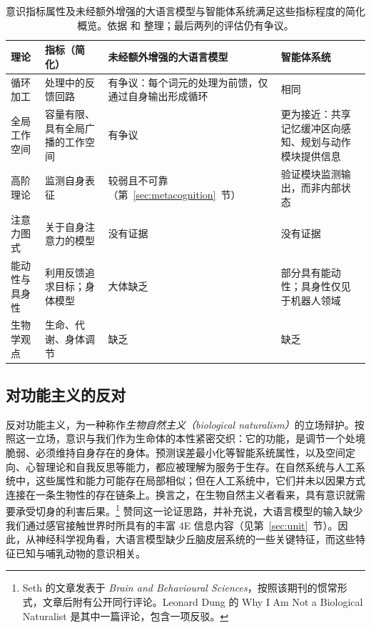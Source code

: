 \begin{table}
\footnotesize
\begin{tabularx}{\textwidth}{@{}p{2.6cm}p{3.4cm}XX@{}}
\toprule
\textbf{理论} & \textbf{指标（简化）} & \textbf{未经额外增强的大语言模型} & \textbf{智能体系统} \\
\midrule
循环加工 & 处理中的反馈回路 & 有争议：每个词元的处理为前馈，仅通过自身输出形成循环 & 相同 \\
全局工作空间 & 容量有限、具有全局广播的工作空间 & 有争议 & 更为接近：共享记忆缓冲区向感知、规划与动作模块提供信息 \\
高阶理论 & 监测自身表征 & 较弱且不可靠（第~\ref{sec:metacognition}~节） & 验证模块监测输出，而非内部状态 \\
注意力图式 & 关于自身注意力的模型 & 没有证据 & 没有证据 \\
能动性与具身性 & 利用反馈追求目标；身体模型 & 大体缺乏 & 部分具有能动性；具身性仅见于机器人领域 \\
生物学观点 & 生命、代谢、身体调节 & 缺乏 & 缺乏 \\
\bottomrule
\end{tabularx}
\caption{意识指标属性及未经额外增强的大语言模型与智能体系统满足这些指标程度的简化概览。依据 \citet{butlin2023consciousness} 和 \citet{goldstein2024case} 整理；最后两列的评估仍有争议。}\label{tab:indicators}
\end{table}

\subsection{对功能主义的反对} \label{againstfunct}
\citep{seth2025conscious} 反对功能主义，为一种称作\emph{生物自然主义（biological naturalism）}的立场辩护。按照这一立场，意识与我们作为生命体的本性紧密交织：它的功能，是调节一个处境脆弱、必须维持自身存在的身体。预测误差最小化等智能系统属性，以及空间定向、心智理论和自我反思等能力，都应被理解为服务于生存。在自然系统与人工系统中，这些属性和能力可能存在局部相似；但在人工系统中，它们并未以因果方式连接在一条生物性的存在链条上。换言之，在生物自然主义者看来，具有意识就需要承受切身的利害后果。\footnote{Seth 的文章发表于 \textit{Brain and Behavioural Sciences}，按照该期刊的惯常形式，文章后附有公开同行评论。Leonard Dung 的 Why I Am Not a Biological Naturalist 是其中一篇评论，包含一项反驳。}\citet{aru2023feasibility} 赞同这一论证思路，并补充说，大语言模型的输入缺少我们通过感官接触世界时所具有的丰富 4E 信息内容（见第~\ref{sec:unit}~节）。因此，从神经科学视角看，大语言模型缺少丘脑皮层系统的一些关键特征，而这些特征已知与哺乳动物的意识相关。

